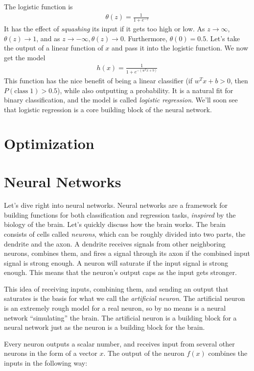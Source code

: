 \documentclass[a4paper,10pt]{article}
\begin{document}
The logistic function is
\begin{align}
  \theta(z) = \frac{1}{1 + e^{-z}}
\end{align}
It has the effect of \emph{squashing} its
input if it gets too high or low.
As $z \rightarrow \infty$, $\theta(z) \rightarrow 1$,
and as $z \rightarrow -\infty, \theta(z) \rightarrow 0$.
Furthermore, $\theta(0) = 0.5$.
Let's take the output of a linear function of $x$
and pass it into the logistic function.
We now get the model
\begin{align}
  h(x) = \frac{1}{1 + e^{-(w^Tx + b)}}
\end{align}
This function has the nice benefit of being a 
linear classifier (if $w^Tx + b > 0$, then
$P(\text{class} \; 1) > 0.5$),
while also outputting a probability.
It is a natural fit for binary classification,
and the model is called \emph{logistic regression}.
We'll soon see that logistic regression is a
core building block of the neural network.

\section{Optimization}

\section{Neural Networks}
Let's dive right into neural networks.
Neural networks are a framework
for building functions
for both classification and regression tasks,
\emph{inspired} by the biology of the brain.
Let's quickly discuss how the brain works.
The brain consists of cells called
\emph{neurons}, which can be roughly divided
into two parts, the dendrite and the axon.
A dendrite receives signals from other neighboring neurons,
combines them, and 
fires a signal through its axon if the combined
input signal is strong enough.
A neuron will saturate if
the input signal is strong enough.
This means that the neuron's output
caps as the input gets stronger.

This idea of receiving inputs,
combining them, and sending an output
that saturates
is the basis for what we call
the \emph{artificial neuron}.
The artificial neuron is an extremely
rough model for a real neuron,
so by no means is a neural
network ``simulating'' the brain.
The artificial neuron is a building block
for a neural network just as the neuron
is a building block for the brain.

Every neuron outputs a scalar number,
and receives input from several other neurons
in the form of a vector $x$.
The output of the neuron $f(x)$ combines
the inputs in the following way:
\end{document}
